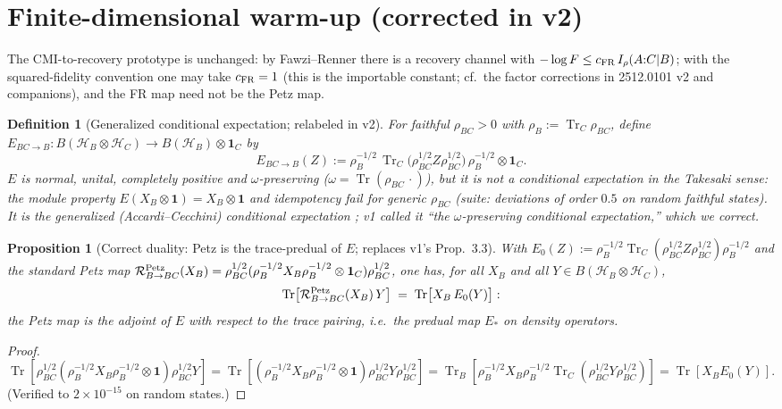 \documentclass[11pt]{article}
\newtheorem{proposition}[theorem]{Proposition}
\newtheorem{definition}[theorem]{Definition}
\theoremstyle{remark}
\newcommand{\Tr}{\operatorname{Tr}}
\begin{document}
\section{Finite-dimensional warm-up (corrected in v2)}
\label{sec:warmup}
The CMI-to-recovery prototype is unchanged: by Fawzi--Renner \cite{FR}
there is a recovery channel with $-\log F \le c_{\rm FR}\,
I_\rho(A{:}C|B)$; with the squared-fidelity convention one may take
$c_{\rm FR} = 1$ (this is the importable constant; cf.\ the factor
corrections in 2512.0101 v2 and companions), and the FR map need not be
the Petz map.

\begin{definition}[Generalized conditional expectation; relabeled in v2]
\label{def:gce}
For faithful $\rho_{BC} > 0$ with $\rho_B := \Tr_C\rho_{BC}$, define
$E_{BC\to B} : B(\mathcal{H}_B \otimes \mathcal{H}_C) \to
B(\mathcal{H}_B) \otimes \mathbf{1}_C$ by
\[
E_{BC\to B}(Z) := \rho_B^{-1/2}\, \Tr_C\!\bigl(\rho_{BC}^{1/2} Z
\rho_{BC}^{1/2}\bigr)\, \rho_B^{-1/2} \otimes \mathbf{1}_C .
\]
$E$ is normal, unital, completely positive and $\omega$-preserving
($\omega = \Tr(\rho_{BC}\,\cdot)$), but it is \emph{not} a conditional
expectation in the Takesaki sense: the module property
$E(X_B \otimes \mathbf{1}) = X_B \otimes \mathbf{1}$ and idempotency fail
for generic $\rho_{BC}$ (suite: deviations of order $0.5$ on random
faithful states). It is the \emph{generalized} (Accardi--Cecchini)
conditional expectation \cite{AC}; v1 called it ``the $\omega$-preserving
conditional expectation,'' which we correct.
\end{definition}

\begin{proposition}[Correct duality: Petz is the trace-predual of $E$;
replaces v1's Prop.~3.3]
\label{prop:predual}
With $E_0(Z) := \rho_B^{-1/2}\Tr_C(\rho_{BC}^{1/2}Z\rho_{BC}^{1/2})
\rho_B^{-1/2}$ and the standard Petz map
$\mathcal{R}^{\rm Petz}_{B\to BC}(X_B) = \rho_{BC}^{1/2}
(\rho_B^{-1/2}X_B\rho_B^{-1/2}\otimes\mathbf{1}_C)\rho_{BC}^{1/2}$, one
has, for all $X_B$ and all $Y \in B(\mathcal{H}_B\otimes\mathcal{H}_C)$,
\[
\Tr\bigl[\mathcal{R}^{\rm Petz}_{B\to BC}(X_B)\, Y\bigr] \;=\;
\Tr\bigl[X_B\, E_0(Y)\bigr] :
\]
the Petz map is the adjoint of $E$ with respect to the \emph{trace}
pairing, i.e.\ the predual map $E_*$ on density operators.
\end{proposition}
\begin{proof}
$\Tr[\rho_{BC}^{1/2}(\rho_B^{-1/2}X_B\rho_B^{-1/2}\otimes\mathbf{1})
\rho_{BC}^{1/2} Y] = \Tr[(\rho_B^{-1/2}X_B\rho_B^{-1/2}\otimes\mathbf{1})
\rho_{BC}^{1/2}Y\rho_{BC}^{1/2}] = \Tr_B[\rho_B^{-1/2}X_B\rho_B^{-1/2}
\Tr_C(\rho_{BC}^{1/2}Y\rho_{BC}^{1/2})] = \Tr[X_B E_0(Y)]$. (Verified to
$2\times10^{-15}$ on random states.)
\end{proof}
\end{document}
